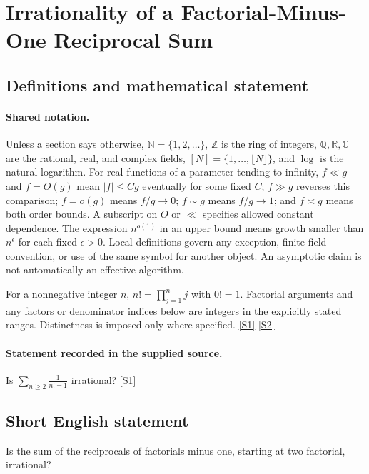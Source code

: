 \documentclass[11pt,a4paper]{article}
\newcommand{\N}{\mathbb{N}}
\newcommand{\Z}{\mathbb{Z}}
\newcommand{\Q}{\mathbb{Q}}
\newcommand{\R}{\mathbb{R}}
\newcommand{\C}{\mathbb{C}}
\newcommand{\sref}[2]{\hyperlink{source:#1:#2}{[S#2]}}
\begin{document}
\section{Irrationality of a Factorial-Minus-One Reciprocal Sum}\label{statement}


\subsection{Definitions and mathematical statement}

\paragraph{Shared notation.}Unless a section says otherwise, $\N=\{1,2,\ldots\}$,
$\Z$ is the ring of integers, $\Q,\R,\C$ are the rational, real, and complex
fields, $[N]=\{1,\ldots,\lfloor N\rfloor\}$, and $\log$ is the natural
logarithm. For real functions of a parameter tending to infinity,
$f\ll g$ and $f=O(g)$ mean $|f|\leq Cg$ eventually for some fixed $C$;
$f\gg g$ reverses this comparison; $f=o(g)$ means $f/g\to0$;
$f\sim g$ means $f/g\to1$; and $f\asymp g$ means both order bounds.
A subscript on $O$ or $\ll$ specifies allowed constant dependence.
The expression $n^{o(1)}$ in an upper bound means growth smaller than
$n^\epsilon$ for each fixed $\epsilon>0$. Local definitions govern any
exception, finite-field convention, or use of the same symbol for another
object. An asymptotic claim is not automatically an effective algorithm.



For a nonnegative integer $n$, $n!=\prod_{j=1}^n j$ with $0!=1$. Factorial arguments and any factors or denominator indices below are integers in the explicitly stated ranges. Distinctness is imposed only where specified. \sref{statement}{1} \sref{statement}{2}

\paragraph{Statement recorded in the supplied source.}
Is $ \sum_{n\geq 2}\frac{1}{n!-1} $ irrational? \sref{statement}{1}

\subsection{Short English statement}

Is the sum of the reciprocals of factorials minus one, starting at two factorial, irrational?
\end{document}
